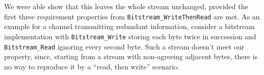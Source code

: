 \FloatBarrier


We were able show that this leaves the
whole stream unchanged, provided the first three requirement properties
from \lstinline{Bitstream_WriteThenRead} are met.
%
As an example for a channel transmitting redundant information,
consider
a bitstream implementation
with \lstinline{Bitstream_Write}
storing each byte twice in succession and \lstinline{Bitstream_Read}
ignoring every second byte.
%
Such a stream doesn't meet our property, since, 
starting from a stream with non-agreeing adjacent bytes, there is no
way to reproduce it by a ``read, then write'' scenario.
